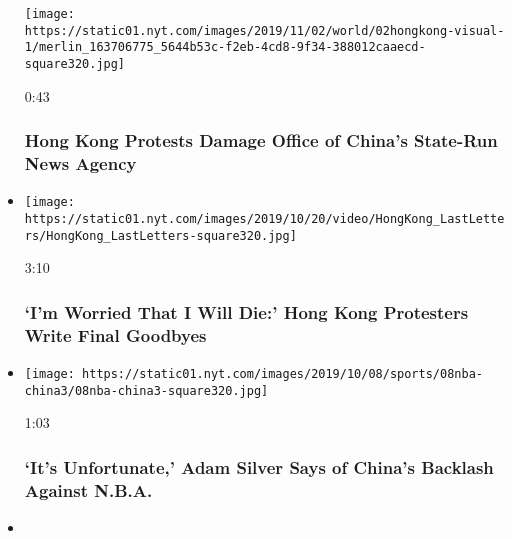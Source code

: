 \begin{itemize}
  \texttt{[image: https://static01.nyt.com/images/2019/11/02/world/02hongkong-visual-1/merlin\_163706775\_5644b53c-f2eb-4cd8-9f34-388012caaecd-square320.jpg]}

  0:43

  \hypertarget{hong-kong-protests-damage-office-of-chinas-state-run-news-agency}{%
  \subsubsection{Hong Kong Protests Damage Office of China's State-Run
  News
  Agency}\label{hong-kong-protests-damage-office-of-chinas-state-run-news-agency}}
\item
  \href{https://www.nytimes.com/video/world/asia/100000006754031/hong-kong-protesters.html?action=click\&module=video-series-bar\&region=header\&pgtype=Article\&playlistId=video/hk-protest}{}

  \texttt{[image: https://static01.nyt.com/images/2019/10/20/video/HongKong\_LastLetters/HongKong\_LastLetters-square320.jpg]}

  3:10

  \hypertarget{im-worried-that-i-will-die-hong-kong-protesters-write-final-goodbyes}{%
  \subsubsection{`I'm Worried That I Will Die:' Hong Kong Protesters
  Write Final
  Goodbyes}\label{im-worried-that-i-will-die-hong-kong-protesters-write-final-goodbyes}}
\item
  \href{https://www.nytimes.com/video/sports/basketball/100000006757507/adam-silver-china.html?action=click\&module=video-series-bar\&region=header\&pgtype=Article\&playlistId=video/hk-protest}{}

  \texttt{[image: https://static01.nyt.com/images/2019/10/08/sports/08nba-china3/08nba-china3-square320.jpg]}

  1:03

  \hypertarget{its-unfortunate-adam-silver-says-of-chinas-backlash-against-nba}{%
  \subsubsection{`It's Unfortunate,' Adam Silver Says of China's
  Backlash Against
  N.B.A.}\label{its-unfortunate-adam-silver-says-of-chinas-backlash-against-nba}}
\item
  \href{https://www.nytimes.com/video/sports/basketball/100000006755297/james-harden-china-apology.html?action=click\&module=video-series-bar\&region=header\&pgtype=Article\&playlistId=video/hk-protest}{}


\end{itemize}
